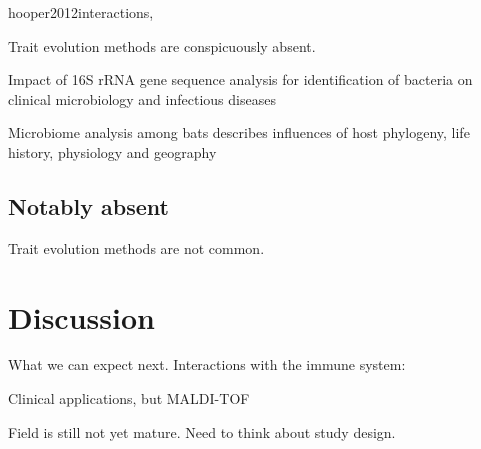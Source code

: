 \documentclass{amsart}
\newcommand{\forarxiv}[1]{#1}
\newcommand{\notforarxiv}[1]{}
\newcommand{\FIGmassTransport}{\
\begin{figure}[ht]
\begin{center}
  \forarxiv{\texttt{[image: mass\_transport.pdf]}}
\end{center}
\caption{\
  Caption goes here.
}
\label{FIGmassTransport}
\end{figure}
}
\begin{document}
hooper2012interactions,

Trait evolution methods are conspicuously absent.

\cite{wylie2012sequence}
\cite{chen2012associating}

\cite{clarridge2004}
{{I}mpact of 16{S} r{RNA} gene sequence analysis for identification of bacteria on clinical microbiology and infectious diseases}

\cite{phillips2012microbiome}
Microbiome analysis among bats describes influences of host phylogeny, life history, physiology and geography


\subsection{Notably absent}
Trait evolution methods are not common.


\section{Discussion}

What we can expect next.
Interactions with the immune system:
\cite{hooper2012interactions}

Clinical applications, but MALDI-TOF

Field is still not yet mature.
Need to think about study design.

\notforarxiv{
\newpage
\section{Figure Legends}
\clearpage

\newpage
}



\end{document}
